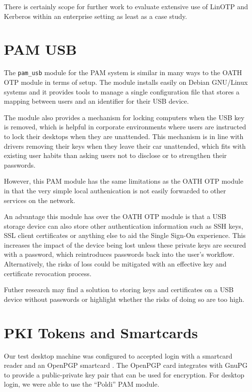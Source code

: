 \documentclass{report}
\begin{document}
There is certainly scope for further work to evaluate extensive
use of LinOTP and Kerberos within an enterprise setting as least as
a case study.

\section{PAM USB}

The \texttt{pam\_usb} module for the PAM system is similar in many
ways to the OATH OTP module in terms of setup. The module
installs easily on Debian GNU/Linux systems and it provides
tools to manage a single configuration file that stores a
mapping between users and an identifier for their USB device.

The module also provides a mechanism for locking computers
when the USB key is removed, which is helpful in corporate
environments where users are instructed to lock their desktops
when they are unattended. This mechanism is in line with
drivers removing their keys when they leave their car
unattended, which fits with existing user
habits than asking users not to disclose or to strengthen
their passwords.

However, this PAM module has the same limitations as the
OATH OTP module in that the very simple local authenication
is not easily forwarded to other services on the network.

An advantage this module has over the OATH OTP module is that
a USB storage device can also store other authentication
information such as SSH keys, SSL client certificates or
anything else to aid the Single Sign-On experience. This
increases the impact of the device being lost unless
these private keys are secured with a password, which
reintroduces passwords back into the user's workflow. Alternatively,
the risks of loss could be mitigated with an effective
key and certificate revocation process.

Futher research may find a solution to storing keys
and certificates on a USB device without passwords or highlight
whether the risks of doing so are too high.

\section{PKI Tokens and Smartcards}

Our test desktop machine was configured to accepted login with a smartcard
reader and an OpenPGP smartcard \parencite{pietig2009functional}. The OpenPGP
card integrates with GnuPG to provide a public-private key pair that can
be used for encryption. For desktop login, we were able to use the ``Poldi''
PAM module.
\end{document}
